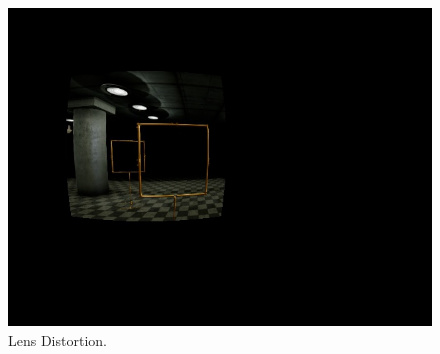 \begin{figure}[htbp]
\begin{minipage}{0.33\textwidth}
		\includegraphics[width=\textwidth]{fig/gate_example_distorted}
	\caption{Lens Distortion. }		
\label{fig:distortion}
	\end{minipage}


\end{figure}
